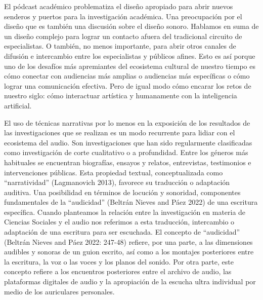 \documentclass[
]{interact}
\begin{document}
El pódcast académico problematiza el diseño apropiado para abrir nuevos
senderos y puertos para la investigación académica. Una preocupación por
el diseño que es también una discusión sobre el diseño sonoro. Hablamos
en suma de un diseño complejo para lograr un contacto afuera del
tradicional circuito de especialistas. O también, no menos importante,
para abrir otros canales de difusión e intercambio entre los
especialistas y públicos afines. Esto es así porque uno de los desafíos
más apremiantes del ecosistema cultural de nuestro tiempo es cómo
conectar con audiencias más amplias o audiencias más específicas o cómo
lograr una comunicación efectiva. Pero de igual modo cómo encarar los
retos de nuestro siglo: cómo interactuar artística y humanamente con la
inteligencia artificial.

El uso de técnicas narrativas por lo menos en la exposición de los
resultados de las investigaciones que se realizan es un modo recurrente
para lidiar con el ecosistema del audio. Son investigaciones que han
sido regularmente clasificadas como investigación de corte cualitativo o
a profundidad. Entre los géneros más habituales se encuentran
biografías, ensayos y relatos, entrevistas, testimonios e intervenciones
públicas. Esta propiedad textual, conceptualizada como ``narratividad''
(Lagmanovich 2013), favorece su traducción o adaptación auditiva. Una
posibilidad en términos de locución y sonoridad, componentes
fundamentales de la ``audicidad'' (Beltrán Nieves and Páez 2022) de una
escritura específica. Cuando planteamos la relación entre la
investigación en materia de Ciencias Sociales y el audio nos referimos a
esta traducción, intercambio o adaptación de una escritura para ser
escuchada. El concepto de ``audicidad'' (Beltrán Nieves and Páez 2022:
247-48) refiere, por una parte, a las dimensiones audibles y sonoras de
un guion escrito, así como a los montajes posteriores entre la
escritura, la voz o las voces y los planos del sonido. Por otra parte,
este concepto refiere a los encuentros posteriores entre el archivo de
audio, las plataformas digitales de audio y la apropiación de la escucha
ultra individual por medio de los auriculares personales.
\end{document}
